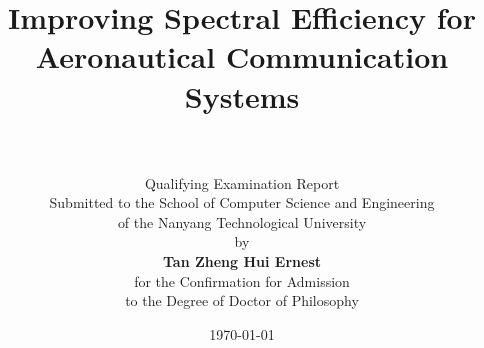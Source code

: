 
\title{\sc
\vspace{-0.5in} Improving Spectral Efficiency for Aeronautical Communication Systems\\
\vspace*{0.3in} \centering
{}\\[1em]}

\author{
Qualifying Examination Report\\
Submitted to the School of Computer Science and Engineering\\
of the Nanyang Technological University\\[1em]
by\\[1em]
{\rm\bf Tan Zheng Hui Ernest}\\[1.5em]
for the Confirmation for Admission \\
to the Degree of Doctor of Philosophy\\[1.5em]
}

\date{\today}
\maketitle
\thispagestyle{empty}        %
